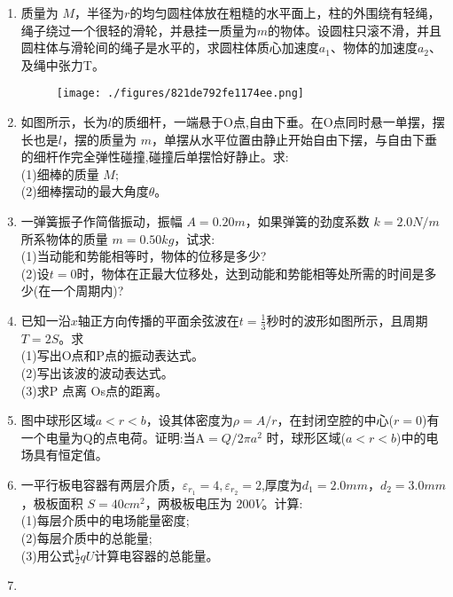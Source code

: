 
\begin{enumerate}
\item 质量为 $M$，半径为$r$的均匀圆柱体放在粗糙的水平面上，柱的外围绕有轻绳，绳子绕过一个很轻的滑轮，并悬挂一质量为$m $的物体。设圆柱只滚不滑，并且圆柱体与滑轮间的绳子是水平的，求圆柱体质心加速度$ a_1$、物体的加速度$ a_2$、及绳中张力T。
\begin{figure}[ht]
\centering
\texttt{[image: ./figures/821de792fe1174ee.png]}
\caption{} \label{fig_SD05_1}
\end{figure}
\item 如图所示，长为$l$的质细杆，一端悬于O点,自由下垂。在O点同时悬一单摆，摆长也是$l$，摆的质量为 $m$，单摆从水平位置由静止开始自由下摆，与自由下垂的细杆作完全弹性碰撞,碰撞后单摆恰好静止。求:\\
(1)细棒的质量 $M;$\\
(2)细棒摆动的最大角度$\theta$。
\item 一弹簧振子作简偕振动，振幅 $A=0.20m$，如果弹簧的劲度系数 $k=2.0N/m$所系物体的质量 $m=0.50kg$，试求:\\
(1)当动能和势能相等时，物体的位移是多少?\\
(2)设$t=0$时，物体在正最大位移处，达到动能和势能相等处所需的时间是多少(在一个周期内)?
\item 已知一沿$x$轴正方向传播的平面余弦波在$t=\frac{1}{3}$秒时的波形如图所示，且周期$T=2S$。求\\
(1)写出O点和P点的振动表达式。\\
(2)写出该波的波动表达式。\\
(3)求P 点离 Os点的距离。
\item 图中球形区域$a<r<b$，设其体密度为$\rho=A/r$，在封闭空腔的中心($r=0$)有一个电量为Q的点电荷。证明:当A$=Q/2\pi a^2$ 时，球形区域($a<r<b$)中的电场具有恒定值。
\item 一平行板电容器有两层介质，$\varepsilon_{r_1}=4,\varepsilon_{r_2}=2$,厚度为$ d_1=2.0mm$，$d_2=3.0mm$，极板面积 $S=40cm^2$，两极板电压为 $200V$。计算:\\
(1)每层介质中的电场能量密度;\\
(2)每层介质中的总能量;\\
(3)用公式$\frac{1}{2}qU$计算电容器的总能量。
\item 
\end{enumerate}